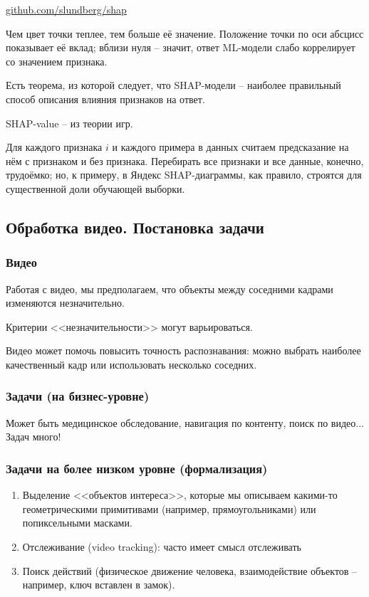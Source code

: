 \documentclass[main.tex]{subfiles}
\begin{document}
\href{https://github.com/slundberg/shap}{github.com/slundberg/shap}

Чем цвет точки теплее, тем больше её значение.
Положение точки по оси абсцисс показывает её вклад; вблизи нуля -- значит, ответ ML-модели слабо коррелирует со значением признака.

Есть теорема, из которой следует, что SHAP-модели -- наиболее правильный способ описания влияния признаков на ответ.

SHAP-value -- из теории игр.

Для каждого признака $ i $ и каждого примера в данных считаем предсказание на нём с признаком и без признака.
Перебирать все признаки и все данные, конечно, трудоёмко; но, к примеру, в Яндекс SHAP-диаграммы, как правило, строятся для существенной доли обучающей выборки.

\subsection{Обработка видео. Постановка задачи}

\subsubsection{Видео}

Работая с видео, мы предполагаем, что объекты между соседними кадрами изменяются незначительно.

Критерии <<незначительности>> могут варьироваться.

Видео может помочь повысить точность распознавания: можно выбрать наиболее качественный кадр или использовать несколько соседних.

\subsubsection{Задачи (на бизнес-уровне)}

Может быть медицинское обследование, навигация по контенту, поиск по видео...
Задач много!

\subsubsection{Задачи на более низком уровне (формализация)}

\begin{enumerate}[noitemsep]
    \item Выделение <<объектов интереса>>, которые мы описываем какими-то геометрическими примитивами (например, прямоугольниками) или попиксельными масками.
    \item Отслеживание (video tracking): часто имеет смысл отслеживать
    \item Поиск действий (физическое движение человека, взаимодействие объектов -- например, ключ вставлен в замок).
\end{enumerate}
\end{document}
